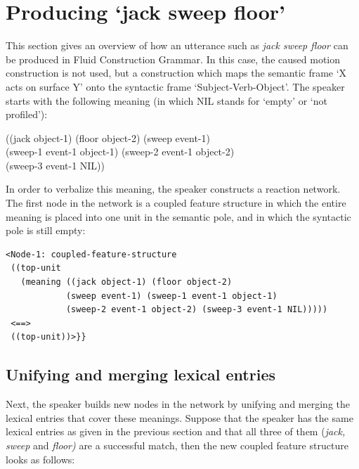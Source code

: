 \section{Producing `jack sweep floor'}

This section gives an overview of how an utterance such as {\em jack sweep floor} can be produced in Fluid Construction Grammar. In this case, the caused motion construction is not used, but a construction which maps the semantic frame `X acts on surface Y' onto the syntactic frame `Subject-Verb-Object'. The speaker starts with the following meaning (in which NIL stands for `empty' or `not profiled'):

\ea
((jack object-1) (floor object-2) (sweep event-1) 
\\ \hspace*{3mm}(sweep-1 event-1 object-1) (sweep-2 event-1 object-2) 
\\ \hspace*{3mm}(sweep-3 event-1 NIL))
\z

In order to verbalize this meaning, the speaker constructs a reaction network. The first node in the network is a coupled feature structure in which the entire meaning is placed into one unit in the semantic pole, and in which the syntactic pole is still empty:


\ea
\begin{lstlisting}
<Node-1: coupled-feature-structure
 ((top-unit
   (meaning ((jack object-1) (floor object-2)
            (sweep event-1) (sweep-1 event-1 object-1)
            (sweep-2 event-1 object-2) (sweep-3 event-1 NIL)))))
 <==>
 ((top-unit))>}}

\end{lstlisting}
\z
\subsection{Unifying and merging lexical entries}

Next, the speaker builds new nodes in the network by unifying and merging the lexical entries that cover these meanings. Suppose that the speaker has the same lexical entries as given in the previous section and that all three of them ({\em jack, sweep} and {\em floor)} are a successful match, then the new coupled feature structure looks as follows:


